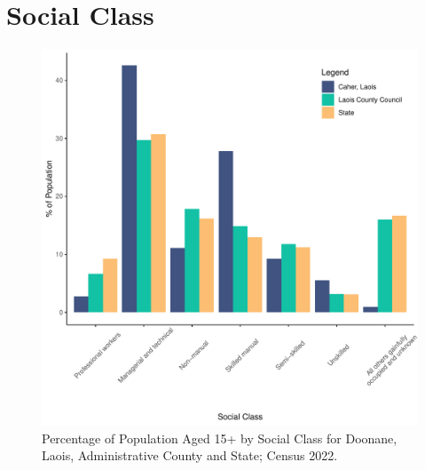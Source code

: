 \documentclass{article}
\begin{document}
\section{Social Class}\label{sect:SC}
\begin{figure}[H]
	\centering
	\includegraphics[width = 140mm]{../figures/SocialClassED.pdf}
	\caption{Percentage of Population Aged 15+ by Social Class for Doonane, Laois, Administrative County and State; Census 2022.}
	\label{fig:vbnv}
	\end{figure}
\end{document}
